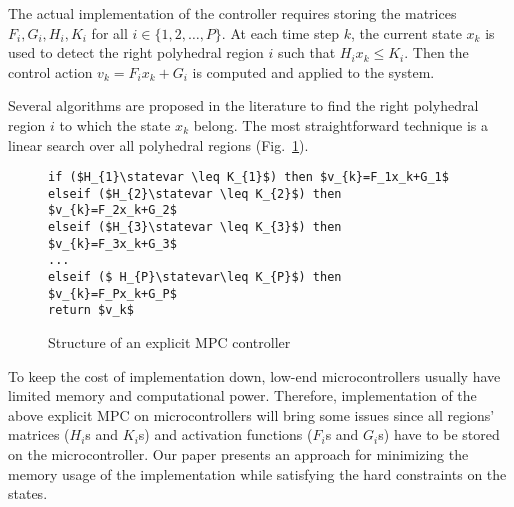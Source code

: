 The actual implementation of the controller requires storing the matrices $F_i,G_i,H_i,K_i$ for all $i\in\{1,2,\ldots,P\}$. At each time step $k$, the current state $x_k$ is used to detect the right polyhedral region $i$ such that $H_i x_k\le K_i$. Then the control action $v_k = F_i x_k + G_i$ is computed and applied to the system.

Several algorithms are proposed in the literature \cite{Mnnigmann:2011,Jones:2006} to find the right polyhedral region $i$ to which the state $x_k$ belong. 
The most straightforward technique is a linear search over all polyhedral regions (Fig.~\ref{lst:caseof}).

\begin{figure}[t]
\begin{lstlisting}[mathescape=true,basicstyle=\small\ttfamily,morekeywords={if, then, elseif, return}]
if ($H_{1}\statevar \leq K_{1}$) then $v_{k}=F_1x_k+G_1$
elseif ($H_{2}\statevar \leq K_{2}$) then $v_{k}=F_2x_k+G_2$
elseif ($H_{3}\statevar \leq K_{3}$) then $v_{k}=F_3x_k+G_3$
...
elseif ($ H_{P}\statevar\leq K_{P}$) then $v_{k}=F_Px_k+G_P$
return $v_k$
\end{lstlisting}
\caption{Structure of an explicit MPC controller}
\label{lst:caseof}
\end{figure}

To keep the cost of implementation down, low-end microcontrollers usually have
limited memory and computational power. Therefore, implementation of the above
explicit MPC on microcontrollers will bring some issues since all regions'
matrices ($H_i$s and $K_i$s) and activation functions ($F_i$s and $G_i$s) have
to be stored on the microcontroller. Our paper presents an
approach for minimizing the memory usage of the implementation while satisfying
the hard constraints on the states.
